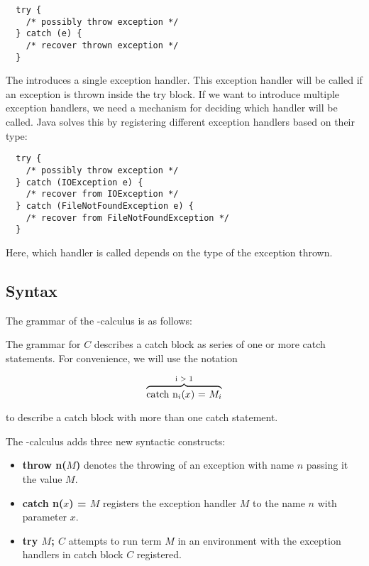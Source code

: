 \begin{Verbatim}
  try {
    /* possibly throw exception */
  } catch (e) {
    /* recover thrown exception */ 
  }
\end{Verbatim}

The  introduces a single exception handler.
This exception handler will be called if an exception is thrown inside the try block.
If we want to introduce multiple exception handlers,
we need a mechanism for deciding which handler will be called.
Java solves this by registering different exception handlers based on their type:

\begin{Verbatim}
  try {
    /* possibly throw exception */
  } catch (IOException e) {
    /* recover from IOException */  
  } catch (FileNotFoundException e) {
    /* recover from FileNotFoundException */ 
  }
\end{Verbatim}

Here, which handler is called depends on the type of the exception thrown.

\subsection{Syntax}

The grammar of the \ltry-calculus is as follows:

The grammar for $C$ describes a catch block as series of one or more catch statements. 
For convenience, we will use the notation 

\[
  \overbrace{\hbox{\text{catch n$_i$($x$) = $M_i$}}}^{\scriptsize\hbox{i > 1}}
\]

to describe a catch block with more than one catch statement. 

The \ltry-calculus adds three new syntactic constructs:
\begin{itemize}
\item \textbf{throw n($M$)} denotes the throwing of an exception with name $n$ passing it the value $M$.
\item \textbf{catch n($x$) = $M$} registers the exception handler $M$ to the name $n$ with parameter $x$.
\item \textbf{try $M$; $C$} attempts to run term $M$ in an environment with the exception handlers in catch block $C$ registered.
\end{itemize}

